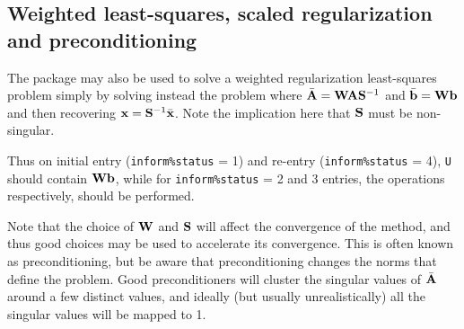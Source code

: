 \documentclass{galahad}
\newcommand{\packagename}{LS\-RT}
\begin{document}

\subsection{Weighted least-squares, scaled regularization and preconditioning}
The package may also be used to solve a weighted regularization
least-squares problem
simply by solving instead the problem
where $\bar{{\mathbf{A}}} = {\mathbf{W}} {\mathbf{A}} {\mathbf{S}}^{-1}$ and
$\bar{{\mathbf{b}}} = {\mathbf{W}} {\mathbf{b}}$
and then recovering ${\mathbf{x}} = {\mathbf{S}}^{-1} \bar{{\mathbf{x}}}$. Note the implication here
that ${\mathbf{S}}$ must be non-singular.

Thus on initial entry ({\tt inform\%status} = 1) and re-entry
({\tt inform\%status} = 4), {\tt U} should contain ${\mathbf{W}} {\mathbf{b}}$,
while for {\tt inform\%status} = 2 and 3 entries, the operations
respectively, should be performed.

Note that the choice of ${\mathbf{W}}$ and ${\mathbf{S}}$ will affect the convergence of the
method, and thus good choices may be used to accelerate its convergence. This
is often known as preconditioning, but be aware that preconditioning changes
the norms that define the problem. Good preconditioners will cluster
the singular values of $\bar{{\mathbf{A}}}$ around a few distinct values, and ideally
(but usually unrealistically) all the singular values will be mapped to 1.


\end{document}
